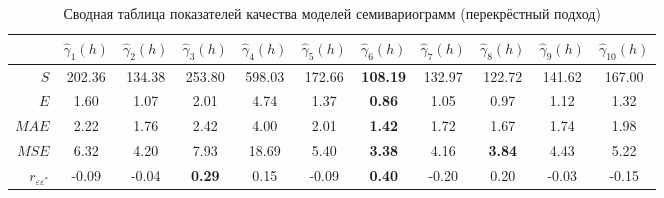 \begin{table}[ht]
\centering
\caption{Сводная таблица показателей качества моделей семивариограмм (перекрёстный подход)}
\label{table:summary-cv}
{\footnotesize
\begin{tabular}{r|cccccccccc}
  \hline
 & $ \widehat{\gamma}_1(h) $ & $ \widehat{\gamma}_2(h) $ & $ \widehat{\gamma}_3(h) $ & $ \widehat{\gamma}_4(h) $ & $ \widehat{\gamma}_5(h) $ & \boldmath$ \widehat{\gamma}_6(h) $ & $ \widehat{\gamma}_7(h) $ & $ \widehat{\gamma}_8(h) $ & $ \widehat{\gamma}_9(h) $ & $ \widehat{\gamma}_{10}(h) $ \\ 
  \hline
  $ S $ & 202.36 & 134.38 & 253.80 & 598.03 & 172.66 & \textbf{108.19} & 132.97 & 122.72 & 141.62 & 167.00 \\ 
  $ E $ & 1.60 & 1.07 & 2.01 & 4.74 & 1.37 & \textbf{0.86} & 1.05 & 0.97 & 1.12 & 1.32 \\ 
  $ MAE $ & 2.22 & 1.76 & 2.42 & 4.00 & 2.01 & \textbf{1.42} & 1.72 & 1.67 & 1.74 & 1.98 \\ 
  $ MSE $ & 6.32 & 4.20 & 7.93 & 18.69 & 5.40 & \textbf{3.38} & 4.16 & \textbf{3.84} & 4.43 & 5.22 \\ 
  $ r_{\varepsilon\varepsilon^{*}} $ & -0.09 & -0.04 & \textbf{0.29} & 0.15 & -0.09 & \textbf{0.40} & -0.20 & 0.20 & -0.03 & -0.15 \\ 
   \hline
\end{tabular}
}
\end{table}
